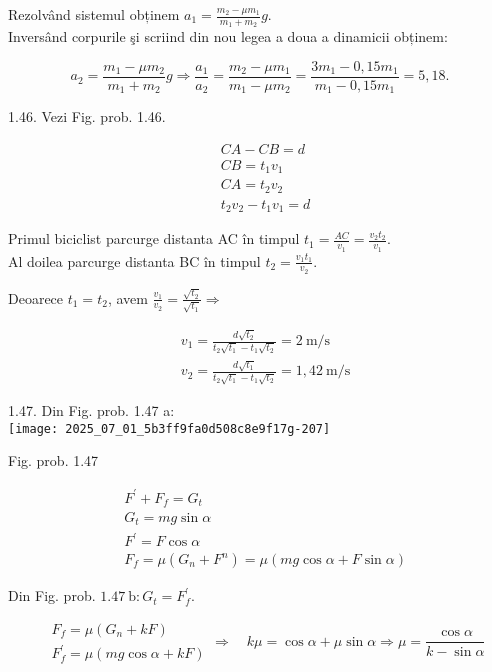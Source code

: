 Rezolvând sistemul obținem $a_{1}=\frac{m_{2}-\mu m_{1}}{m_{1}+m_{2}} g$.\\
Inversând corpurile şi scriind din nou legea a doua a dinamicii obținem:

$$
a_{2}=\frac{m_{1}-\mu m_{2}}{m_{1}+m_{2}} g \Rightarrow \frac{a_{1}}{a_{2}}=\frac{m_{2}-\mu m_{1}}{m_{1}-\mu m_{2}}=\frac{3 m_{1}-0,15 m_{1}}{m_{1}-0,15 m_{1}}=5,18 .
$$

1.46. Vezi Fig. prob. 1.46.

$$
\begin{aligned}
& C A-C B=d \\
& C B=t_{1} v_{1} \\
& C A=t_{2} v_{2} \\
& t_{2} v_{2}-t_{1} v_{1}=d
\end{aligned}
$$

Primul biciclist parcurge distanta AC în timpul $t_{1}=\frac{A C}{v_{1}}=\frac{v_{2} t_{2}}{v_{1}}$.\\
Al doilea parcurge distanta BC în timpul $t_{2}=\frac{v_{1} t_{1}}{v_{2}}$.

Deoarece $t_{1}=t_{2}$, avem $\frac{v_{1}}{v_{2}}=\frac{\sqrt{t_{2}}}{\sqrt{t_{1}}} \Rightarrow$

$$
\begin{aligned}
& v_{1}=\frac{d \sqrt{t_{2}}}{t_{2} \sqrt{t_{1}}-t_{1} \sqrt{t_{2}}}=2 \mathrm{~m} / \mathrm{s} \\
& v_{2}=\frac{d \sqrt{t_{1}}}{t_{2} \sqrt{t_{1}}-t_{1} \sqrt{t_{2}}}=1,42 \mathrm{~m} / \mathrm{s}
\end{aligned}
$$

1.47. Din Fig. prob. 1.47 a:\\
\texttt{[image: 2025\_07\_01\_5b3ff9fa0d508c8e9f17g-207]}

Fig. prob. 1.47

$$
\begin{aligned}
& F^{\prime}+F_{f}=G_{t} \\
& G_{t}=m g \sin \alpha \\
& F^{\prime}=F \cos \alpha \\
& F_{f}=\mu\left(G_{n}+F^{n}\right)=\mu(m g \cos \alpha+F \sin \alpha)
\end{aligned}
$$

Din Fig. prob. $1.47 \mathrm{~b}: G_{t}=F_{f}^{\prime}$.

$$
\begin{aligned}
& F_{f}=\mu\left(G_{n}+k F\right) \\
& F_{f}^{\prime}=\mu(m g \cos \alpha+k F)
\end{aligned} \Rightarrow \quad k \mu=\cos \alpha+\mu \sin \alpha \Rightarrow \mu=\frac{\cos \alpha}{k-\sin \alpha}
$$

